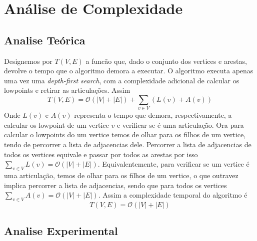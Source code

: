\documentclass[12pt]{article}
\begin{document}
\section{Análise de Complexidade}
\subsection{Analise Teórica}
Designemos por $T(V,E)$ a funcão que, dado o conjunto dos vertices e arestas, devolve o tempo que o algoritmo demora a executar. O algoritmo executa apenas uma vez uma \textit{depth-first search}, com a complexidade adicional de calcular os lowpoints e retirar as articulações. Assim
\[ T(V,E) = \mathcal{O}(|V|+|E|) + \sum\limits_{v\in V}(L(v) + A(v)) \]
Onde  $L(v)$ e $A(v)$ representa o tempo que demora, respectivamente, a calcular os lowpoint de um vertice $v$ e verificar se é uma articulação. Ora para calcular o lowpoints do um vertice temos de olhar para os filhos de um vertice, tendo de percorrer a lista de adjacencias dele. Percorrer a lista de adjacencias de todos os vertices equivale e passar por todos as arestas por isso $\sum\limits_{v\in V}L(v) = \mathcal{O}(|V|+|E|)$. Equivalentemente, para verificar se um vertice é uma articulação, temos de olhar para os filhos de um vertice, o que outravez implica percorrer a lista de adjacencias, sendo que para todos os vertices $\sum\limits_{v\in V}A(v) = \mathcal{O}(|V|+|E|)$. Assim a complexidade temporal do algoritmo é 
\[ T(V,E) = \mathcal{O}(|V|+|E|)\]
\subsection{Analise Experimental}
\end{document}

